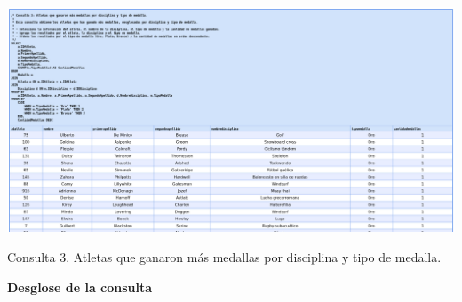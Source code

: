 \begin{center}
    \includegraphics[width=16.5cm]{resources/Chapters/Consultas/Imagenes/Consulta3.jpeg} 
    
   Consulta 3. Atletas que ganaron más medallas por disciplina y tipo de medalla.
\end{center}

\textbf{Desglose de la consulta}

